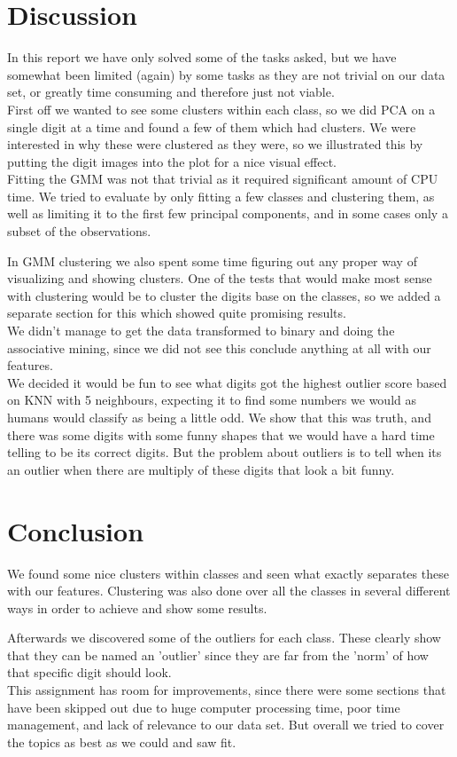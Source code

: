 \chapter{Discussion}
In this report we have only solved some of the tasks asked, but we have somewhat been limited (again) by some tasks as they are not trivial on our data set, or greatly time consuming and therefore just not viable. \\

First off we wanted to see some clusters within each class, so we did PCA on a single digit at a time and found a few of them which had clusters. We were interested in why these were clustered as they were, so we illustrated this by putting the digit images into the plot for a nice visual effect. \\

Fitting the GMM was not that trivial as it required significant amount of CPU time. We tried to evaluate by only fitting a few classes and clustering them, as well as limiting it to the first few principal components, and in some cases only a subset of the observations. 

In GMM clustering we also spent some time figuring out any proper way of visualizing and showing clusters. One of the tests that would make most sense with clustering would be to cluster the digits base on the classes, so we added a separate section for this which showed quite promising results. \\

We didn't manage to get the data transformed to binary and doing the associative mining, since we did not see this conclude anything at all with our features. \\

We decided it would be fun to see what digits got the highest outlier score based on KNN with 5 neighbours, expecting it to find some numbers we would as humans would classify as being a little odd. We show that this was truth, and there was some digits with some funny shapes that we would have a hard time telling to be its correct digits. But the problem about outliers is to tell when its an outlier when there are multiply of these digits that look a bit funny. 

 
\chapter{Conclusion}
We found some nice clusters within classes and seen what exactly separates these with our features. Clustering was also done over all the classes in several different ways in order to achieve and show some results. 

Afterwards we discovered some of the outliers for each class. These clearly show that they can be named an 'outlier' since they are far from the 'norm' of how that specific digit should look. \\

This assignment has room for improvements, since there were some sections that have been skipped out due to huge computer processing time, poor time management, and lack of relevance to our data set. But overall we tried to cover the topics as best as we could and saw fit.

